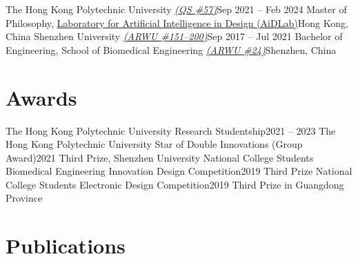 \documentclass[letterpaper,11pt]{article}
\begin{document}
    \resumeSubHeadingListStart
        \resumeSubheading
            {The Hong Kong Polytechnic University
            \href{https://www.topuniversities.com/world-university-rankings/2025?page=3}{\textsl{(QS \#57)}}}{Sep 2021 -- Feb 2024}
            {Master of Philosophy, \href{https://www.aidlab.hk/en/}{Laboratory for Artificial Intelligence in Design (AiDLab)}}{Hong Kong, China}
        \resumeSubheading
            {Shenzhen University
            \href{https://www.shanghairanking.com/institution/shenzhen-university}{\textsl{(ARWU \#151--200)}}}{Sep 2017 -- Jul 2021}
            {Bachelor of Engineering, School of Biomedical Engineering
            \href{https://www.shanghairanking.com/rankings/gras/2023/RS0208}{\textsl{(ARWU \#24)}}}{Shenzhen, China}
    \resumeSubHeadingListEnd

    \section{Awards}

    \resumeSubHeadingListStart
        \resumeSubheading
            {The Hong Kong Polytechnic University Research Studentship}{2021 -- 2023}
            {The Hong Kong Polytechnic University}{}
        \resumeSubheading
            {Star of Double Innovations (Group Award)}{2021}
            {Third Prize, Shenzhen University}{}
        \resumeSubheading
            {National College Students Biomedical Engineering Innovation Design Competition}{2019}
            {Third Prize}{}
        \resumeSubheading
            {National College Students Electronic Design Competition}{2019}
            {Third Prize in Guangdong Province}{}
    \resumeSubHeadingListEnd

    \section{Publications}
    
    
\end{document}
